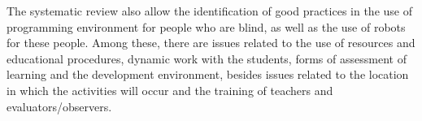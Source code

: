 The systematic review also allow the identification of good practices in the use of programming environment for people who are blind, as well as the use of robots for these people. Among these, there are issues related to the use of resources and educational procedures, dynamic work with the students, forms of assessment of learning and the development environment, besides issues related to the location in which the activities will occur and the training of teachers and evaluators/observers.







